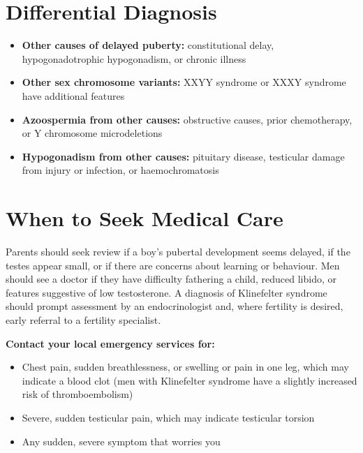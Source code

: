 \section*{Differential Diagnosis}
\begin{itemize}
    \item \textbf{Other causes of delayed puberty:} constitutional delay, hypogonadotrophic hypogonadism, or chronic illness
    \item \textbf{Other sex chromosome variants:} XXYY syndrome or XXXY syndrome have additional features
    \item \textbf{Azoospermia from other causes:} obstructive causes, prior chemotherapy, or Y chromosome microdeletions
    \item \textbf{Hypogonadism from other causes:} pituitary disease, testicular damage from injury or infection, or haemochromatosis
\end{itemize}

\section*{When to Seek Medical Care}
Parents should seek review if a boy's pubertal development seems delayed, if the testes appear small, or if there are concerns about learning or behaviour. Men should see a doctor if they have difficulty fathering a child, reduced libido, or features suggestive of low testosterone. A diagnosis of Klinefelter syndrome should prompt assessment by an endocrinologist and, where fertility is desired, early referral to a fertility specialist.

\textbf{Contact your local emergency services for:}
\begin{itemize}
    \item Chest pain, sudden breathlessness, or swelling or pain in one leg, which may indicate a blood clot (men with Klinefelter syndrome have a slightly increased risk of thromboembolism)
    \item Severe, sudden testicular pain, which may indicate testicular torsion
    \item Any sudden, severe symptom that worries you
\end{itemize}

